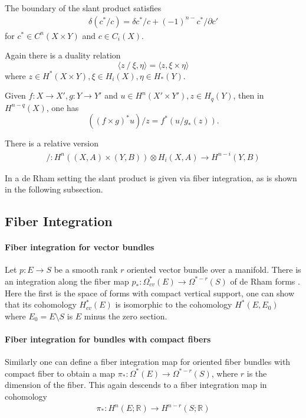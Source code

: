 \documentclass{scrartcl}
\theoremstyle{plain}
\theoremstyle{definition}
\newcommand{\R}{\mathbb R}
\newcommand{\slant}{\mathbin{/}}
\begin{document}
    The boundary of the slant product satisfies
    \begin{align*}
        \delta (c^* / c) = \delta c^* / c + (-1)^{n-} c^* / \partial c'
    \end{align*}
    for $c^*\in C^n(X\times Y)$ and $c\in C_i(X)$.

    Again there is a duality relation $$\langle z\slant\xi, \eta\rangle = \langle z, \xi\times \eta\rangle$$ where $z\in H^*(X\times Y), \xi\in H_i(X), \eta\in H_*(Y)$. 

    Given $f\colon X\to X', g\colon Y\to Y'$ and $u\in H^n(X'\times Y'), z\in H_q(Y)$, then in $H^{n-q}(X)$, one has $$((f\times g)^*u)/z = f^*(u/g_*(z)).$$

    There is a relative version 
    \begin{align*}
        \slant\colon H^n((X,A)\times (Y,B))\otimes H_i(X, A) \to H^{n-i}(Y, B)
    \end{align*}

    In a de Rham setting the slant product is given via fiber integration, as is shown in the following subsection. 

    \subsection{Fiber Integration}\label{subsec:fiber_integration}
    
    \paragraph{Fiber integration for vector bundles} Let $p\colon E\to S$ be a smooth rank $r$ oriented vector bundle over a manifold. There is an integration along the fiber map $p_*\colon \Omega^*_{cv}(E) \to \Omega^{*-r}(S)$ of de Rham forms \cite[I.6]{bott1982differential}. Here the first is the space of forms with compact vertical support, one can show that its cohomology $H^*_{cv}(E)$ is isomorphic to the cohomology $H^*(E, E_0)$ where $E_0 = E\setminus S$ is $E$ minus the zero section.

    \paragraph{Fiber integration for bundles with compact fibers} Similarly one can define a fiber integration map for oriented fiber bundles with compact fiber to obtain a map $\pi_*\colon \Omega^*(E) \to \Omega^{*-r}(S)$, where $r$ is the dimension of the fiber. This again descends to a fiber integration map in cohomology 
    \begin{align*}
        \pi_*\colon H^n(E; \R) \to H^{n-r}(S; \R)
    \end{align*}
    
\end{document}
